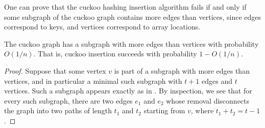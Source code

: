 \documentclass[format=acmsmall, review=false, screen=true]{acmart}
\begin{document}
One can prove that
the cuckoo hashing insertion algorithm fails if and only if  
some subgraph of
the cuckoo graph contains more edges than vertices, since edges
correspond to keys, and vertices correspond to array locations.
\begin{lem}
  The cuckoo graph has a subgraph with more edges than vertices with
  probability $O(1/n)$. That is, cuckoo insertion
  succeeds with probability $1 - O(1/n)$.
\end{lem}
\begin{proof}
  Suppose that some vertex $v$ is part of a subgraph with more edges
  than vertices, and in particular a minimal such subgraph with $t +
  1$ edges and $t$ vertices. Such a subgraph appears exactly as in
  . By inspection, we see that for every such 
  subgraph, there are two edges
  $e_1$ and $e_2$ whose removal disconnects the graph into two paths
  of length $t_1$ and $t_2$ starting from $v$, where $t_1 + t_2 = t -
  1$.


\end{proof}
\end{document}
